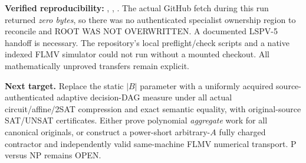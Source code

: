 \documentclass[11pt]{article}
\begin{document}
\noindent\textbf{Verified reproducibility:}
,
,
.
The actual GitHub  fetch during this run returned \emph{zero bytes}, so there was no authenticated specialist ownership region to reconcile and ROOT WAS NOT OVERWRITTEN. A documented LSPV-5 handoff is necessary. The repository's local preflight/check scripts and a native indexed FLMV simulator could not run without a mounted checkout. All mathematically unproved transfers remain explicit.

\noindent\textbf{Next target.} Replace the static $|B|$ parameter with a uniformly acquired source-authenticated adaptive decision-DAG measure under all actual circuit/affine/2SAT compression and exact semantic equality, with original-source SAT/UNSAT certificates. Either prove polynomial \emph{aggregate} work for all canonical originals, or construct a power-short arbitrary-$A$ fully charged contractor and independently valid same-machine FLMV numerical transport. P versus NP remains OPEN.



\end{document}
